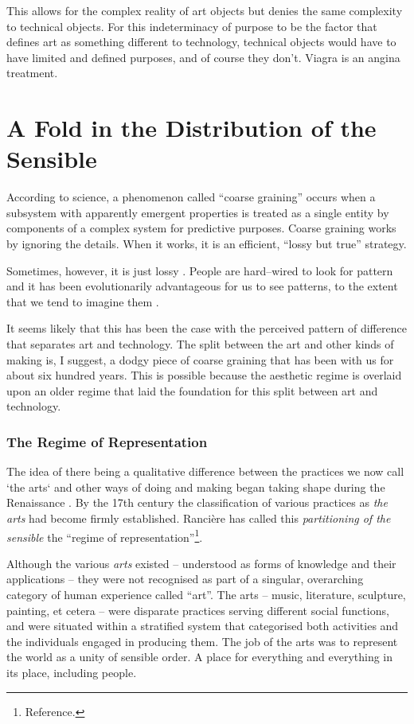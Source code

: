 \documentclass[letter:wpaper]{article}
\begin{document}
    This allows for the complex reality of art objects but denies the same complexity to technical objects. For this indeterminacy of purpose to be the factor that defines art as something different to technology, technical objects would have to have limited and defined purposes, and of course they don't. Viagra is an angina treatment. 

\section{A Fold in the Distribution of the Sensible}
    
    According to science, a phenomenon called ``coarse graining'' occurs when a subsystem with apparently emergent properties is treated as a single entity by components of a complex system for predictive purposes. Coarse graining works by ignoring the details. When it works, it is an efficient, ``lossy but true'' \citep[p.4]{FlackCrsGrnng2017} strategy.

    Sometimes, however, it is just lossy \citep[p.8]{FlackCrsGrnng2017}. People are hard–wired to look for pattern and it has been evolutionarily advantageous for us to see patterns, to the extent that we tend to imagine them \citep{FristonThFrEnrgPrncpl2010}.
    
    It seems likely that this has been the case with the perceived pattern of difference that separates art and technology. The split between the art and other kinds of making is, I suggest, a dodgy piece of coarse graining that has been with us for about six hundred years. This is possible because the aesthetic regime is overlaid upon an older regime that laid the foundation for this split between art and technology. 
    
    \subsubsection{The Regime of Representation}

    The idea of there being a qualitative difference between the practices we now call ‘the arts‘ and other ways of doing and making began taking shape during the Renaissance \citep[p.136]{TatarkiewiczWhtIsArt1971}. By the 17th century the classification of various practices as \emph{the arts} had become firmly established. Rancière has called this \emph{partitioning of the sensible} the ``regime of representation''\footnote{
        Reference.
    }.
    
    Although the various \emph{arts} existed – understood as forms of knowledge and their applications – they were not recognised as part of a singular, overarching category of human experience called ``art''. The arts – music, literature, sculpture, painting, et cetera – were disparate practices serving different social functions, and were situated within a stratified system that categorised both activities and the individuals engaged in producing them. The job of the arts was to represent the world as a unity of sensible order. A place for everything and everything in its place, including people.
    
\end{document}
